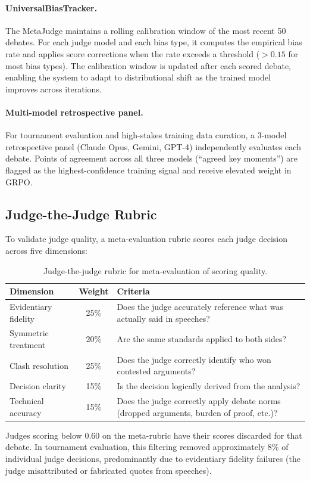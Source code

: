 \paragraph{UniversalBiasTracker.}
The MetaJudge maintains a rolling calibration window of the most recent
50 debates. For each judge model and each bias type, it computes the
empirical bias rate and applies score corrections when the rate exceeds
a threshold ($> 0.15$ for most bias types). The calibration window is
updated after each scored debate, enabling the system to adapt to
distributional shift as the trained model improves across iterations.

\paragraph{Multi-model retrospective panel.}
For tournament evaluation and high-stakes training data curation, a
3-model retrospective panel (Claude Opus, Gemini, GPT-4) independently
evaluates each debate. Points of agreement across all three models
(``agreed key moments'') are flagged as the highest-confidence training
signal and receive elevated weight in GRPO.

\subsection{Judge-the-Judge Rubric}

To validate judge quality, a meta-evaluation rubric scores each judge
decision across five dimensions:

\begin{table}[h]
\centering
\small
\begin{tabular}{lcp{6cm}}
\toprule
\textbf{Dimension} & \textbf{Weight} & \textbf{Criteria} \\
\midrule
Evidentiary fidelity & 25\% & Does the judge accurately reference what was actually said in speeches? \\
Symmetric treatment & 20\% & Are the same standards applied to both sides? \\
Clash resolution & 25\% & Does the judge correctly identify who won contested arguments? \\
Decision clarity & 15\% & Is the decision logically derived from the analysis? \\
Technical accuracy & 15\% & Does the judge correctly apply debate norms (dropped arguments, burden of proof, etc.)? \\
\bottomrule
\end{tabular}
\caption{Judge-the-judge rubric for meta-evaluation of scoring quality.}
\label{tab:judge_rubric}
\end{table}

Judges scoring below 0.60 on the meta-rubric have their scores discarded
for that debate. In tournament evaluation, this filtering removed
approximately 8\% of individual judge decisions, predominantly due to
evidentiary fidelity failures (the judge misattributed or fabricated
quotes from speeches).
